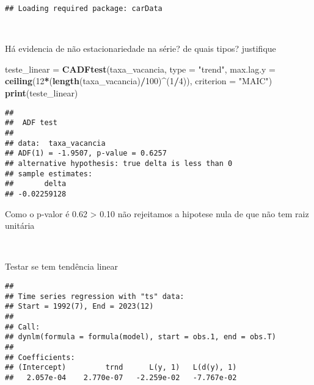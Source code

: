 \documentclass[
]{article}
\newenvironment{Shaded}{\begin{snugshade}}{\end{snugshade}}
\newcommand{\AttributeTok}[1]{\textcolor[rgb]{0.13,0.29,0.53}{#1}}
\newcommand{\DecValTok}[1]{\textcolor[rgb]{0.00,0.00,0.81}{#1}}
\newcommand{\FunctionTok}[1]{\textcolor[rgb]{0.13,0.29,0.53}{\textbf{#1}}}
\newcommand{\NormalTok}[1]{#1}
\newcommand{\OtherTok}[1]{\textcolor[rgb]{0.56,0.35,0.01}{#1}}
\newcommand{\SpecialCharTok}[1]{\textcolor[rgb]{0.81,0.36,0.00}{\textbf{#1}}}
\newcommand{\StringTok}[1]{\textcolor[rgb]{0.31,0.60,0.02}{#1}}
\begin{document}
\begin{verbatim}
## Loading required package: carData
\end{verbatim}

~

Há evidencia de não estacionariedade na série? de quais tipos?
justifique

\begin{Shaded}
\begin{Highlighting}[]
\NormalTok{teste\_linear }\OtherTok{=} \FunctionTok{CADFtest}\NormalTok{(taxa\_vacancia, }\AttributeTok{type =} \StringTok{"trend"}\NormalTok{, }\AttributeTok{max.lag.y =} \FunctionTok{ceiling}\NormalTok{(}\DecValTok{12}\SpecialCharTok{*}\NormalTok{(}\FunctionTok{length}\NormalTok{(taxa\_vacancia)}\SpecialCharTok{/}\DecValTok{100}\NormalTok{)}\SpecialCharTok{\^{}}\NormalTok{(}\DecValTok{1}\SpecialCharTok{/}\DecValTok{4}\NormalTok{)),}
                 \AttributeTok{criterion =} \StringTok{"MAIC"}\NormalTok{)}
\FunctionTok{print}\NormalTok{(teste\_linear)}
\end{Highlighting}
\end{Shaded}

\begin{verbatim}
## 
##  ADF test
## 
## data:  taxa_vacancia
## ADF(1) = -1.9507, p-value = 0.6257
## alternative hypothesis: true delta is less than 0
## sample estimates:
##       delta 
## -0.02259128
\end{verbatim}

Como o p-valor é 0.62 \textgreater{} 0.10 não rejeitamos a hipotese nula
de que não tem raiz unitária

~

Testar se tem tendência linear

\begin{Shaded}
\end{Shaded}

\begin{verbatim}
## 
## Time series regression with "ts" data:
## Start = 1992(7), End = 2023(12)
## 
## Call:
## dynlm(formula = formula(model), start = obs.1, end = obs.T)
## 
## Coefficients:
## (Intercept)         trnd      L(y, 1)   L(d(y), 1)  
##   2.057e-04    2.770e-07   -2.259e-02   -7.767e-02
\end{verbatim}

\begin{Shaded}
\end{Shaded}
\end{document}
